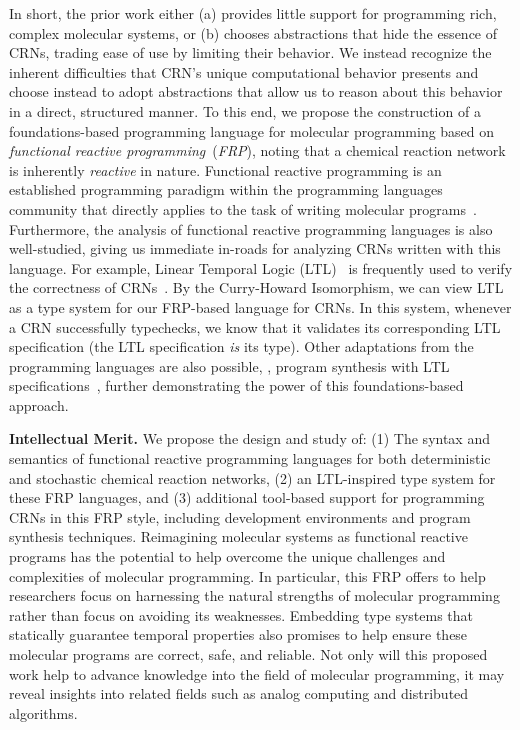 In short, the prior work either (a) provides little support for programming rich, complex molecular systems, or (b) chooses abstractions that hide the essence of CRNs, trading ease of use by limiting their behavior.
We instead recognize the inherent difficulties that CRN's unique computational behavior presents and choose instead to adopt abstractions that allow us to reason about this behavior in a direct, structured manner.
To this end, we propose the construction of a foundations-based programming language for molecular programming based on \emph{functional reactive programming}~(\emph{FRP}), noting that a chemical reaction network is inherently \emph{reactive} in nature.
Functional reactive programming is an established programming paradigm within the programming languages community that directly applies to the task of writing molecular programs~\cite{elliott1997, czaplicki2013, finkbeiner2019, jeffrey2012}.
Furthermore, the analysis of functional reactive programming languages is also well-studied, giving us immediate in-roads for analyzing CRNs written with this language.
For example, Linear Temporal Logic (LTL)~\cite{pnueli1997,manna2012temporal,oBaiKat08} is frequently used to verify the correctness of CRNs~\cite{jKwiTha14,cEHKLLL14,jEKLLLM17}.
By the Curry-Howard Isomorphism, we can view LTL as a type system for our FRP-based language for CRNs.
In this system, whenever a CRN successfully typechecks, we know that it validates its corresponding LTL specification (the LTL specification \emph{is} its type).
Other adaptations from the programming languages are also possible, \eg, program synthesis with LTL specifications~\cite{finkbeiner2019}, further demonstrating the power of this foundations-based approach.

\textbf{Intellectual Merit.}
We propose the design and study of: (1) The syntax and semantics of functional reactive programming languages for both deterministic and stochastic chemical reaction networks, (2) an LTL-inspired type system for these FRP languages, and (3) additional tool-based support for programming CRNs in this FRP style, including development environments and program synthesis techniques.
Reimagining molecular systems as functional reactive programs has the potential to help overcome the unique challenges and complexities of molecular programming.
In particular, this FRP offers to help researchers focus on harnessing the natural strengths of molecular programming rather than focus on avoiding its weaknesses.
Embedding type systems that statically guarantee temporal properties also promises to help ensure these molecular programs are correct, safe, and reliable.
Not only will this proposed work help to advance knowledge into the field of molecular programming, it may reveal insights into related fields such as analog computing and distributed algorithms.

